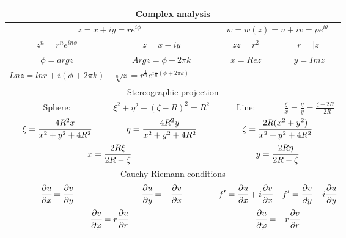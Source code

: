 \begin{tabular}{|cccc|}
	\multicolumn{4}{c}{Complex analysis} \\
	\hline 
	
	\multicolumn{2}{|c}{$\displaystyle z = x+iy = re^{i\phi}$}  &
	\multicolumn{2}{c|}{$\displaystyle w = w(z) = u + iv = \rho e^{i\theta}$}  \\
	\hline
	
	$\displaystyle z^n = r^ne^{in\phi}$ &
	$\displaystyle \overline{z} = x - iy$ &
	$\displaystyle \overline{z}z = r^2$ &
	$\displaystyle r = |z|$ \\
	
	$\displaystyle \phi = {arg}z$ &
	$\displaystyle Argz = \phi + 2\pi k$ &
	$\displaystyle x = Rez$ &
	$\displaystyle y = Imz$ \\
	
	$\displaystyle Ln z = ln r + i(\phi + 2\pi k)$ &	
	\multicolumn{3}{l|}{$\displaystyle \sqrt[n]{z} = r^{\frac{1}{n}}e^{i\frac{1}{n}(\phi+2\pi k)}$} \\
	\hline
	
	\multicolumn{4}{|c|}{Stereographic projection} \\
	
	Sphere: & $\displaystyle \xi^2 + \eta^2+(\zeta - R)^2 = R^2$ &
	Line: & $\displaystyle \frac{\xi}{x} = \frac{\eta}{y} = \frac{\zeta - 2R}{-2R}$ \\
	
	$\displaystyle \xi = \cfrac{4R^2x}{x^2+y^2+4R^2}$ &
	$\displaystyle \eta = \cfrac{4R^2y}{x^2+y^2+4R^2}$ &
	\multicolumn{2}{c|}{$\displaystyle \zeta = \cfrac{2R(x^2+y^2)}{x^2+y^2+4R^2}$} \\
	
	\multicolumn{2}{|c}{$\displaystyle x = \cfrac{2R\xi}{2R-\zeta}$} &
	\multicolumn{2}{c|}{$\displaystyle y = \cfrac{2R\eta}{2R-\zeta}$} \\
	\hline
	
	\multicolumn{4}{|c|}{Cauchy-Riemann conditions} \\
	
	$\displaystyle \cfrac{\partial u}{\partial x} = \cfrac{\partial v}{\partial y}$ &
	$\displaystyle \cfrac{\partial u}{\partial y} = -\cfrac{\partial v}{\partial x}$ &
	$\displaystyle f'=\cfrac{\partial u}{\partial x} + i\cfrac{\partial v}{\partial x}$ &
	$\displaystyle f' = \cfrac{\partial v}{\partial y} - i\cfrac{\partial u}{\partial y}$ \\
	\hline
	
	\multicolumn{2}{|c}{$\displaystyle \cfrac{\partial v}{\partial \phi} = r\cfrac{\partial u}{\partial r}$} &
	\multicolumn{2}{c|}{$\displaystyle \cfrac{\partial u}{\partial \phi} = -r \cfrac{\partial v}{\partial r}$} \\
	\hline
	

\end{tabular}
